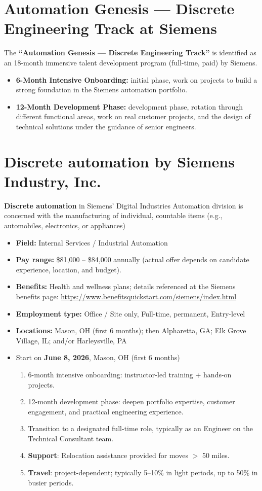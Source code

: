 \documentclass[11pt]{article}
\begin{document}
\section*{Automation Genesis --- Discrete Engineering Track at Siemens}

The \textbf{``Automation Genesis — Discrete Engineering Track''} is identified as 
an 18-month immersive talent development program (full-time, paid) by Siemens.
\begin{itemize}
  \item \textbf{6-Month Intensive Onboarding:} initial phase, work on projects to build a strong foundation in the Siemens automation portfolio.
  \item \textbf{12-Month Development Phase:} development phase, rotation through different functional areas, work on real customer projects, and the design of technical solutions under the guidance of senior engineers.
\end{itemize}

\section*{Discrete automation by \textbf{Siemens Industry, Inc.}}
\textbf{Discrete automation} in Siemens' Digital Industries Automation division is concerned with the manufacturing of individual, countable
items (e.g., automobiles, electronics, or appliances)

\begin{itemize}
  \item \textbf{Field:} Internal Services / Industrial Automation
  \item \textbf{Pay range:} \$81,000 -- \$84,000 annually (actual offer depends on candidate experience, location, and budget).
  \item \textbf{Benefits:} Health and wellness plans; details referenced at the Siemens benefits page: \url{https://www.benefitsquickstart.com/siemens/index.html}
  \item \textbf{Employment type:} Office / Site only, Full-time, permanent, Entry-level
  \item \textbf{Locations:} Mason, OH (first 6 months); then Alpharetta, GA; Elk Grove Village, IL; and/or Harleysville, PA
  \item Start on \textbf{June 8, 2026}, Mason, OH (first 6 months) 
  \begin{enumerate}[label=\arabic*., leftmargin=*]
    \item 6-month intensive onboarding: instructor-led training + hands-on projects.
    \item 12-month development phase: deepen portfolio expertise, customer engagement, and practical engineering experience.
    \item Transition to a designated full-time role, typically as an Engineer on the Technical Consultant team.
    \item \textbf{Support}: Relocation assistance provided for moves $>$ 50 miles.
    \item \textbf{Travel}: project-dependent; typically 5--10\% in light periods, up to 50\% in busier periods.
  \end{enumerate}
\end{itemize}
\end{document}
